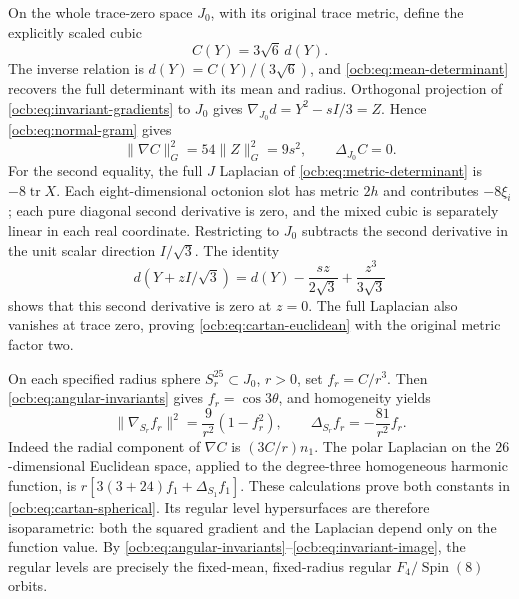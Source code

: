 \documentclass[11pt]{article}
\theoremstyle{definition}
\begin{document}
On the whole trace-zero space $J_0$, with its original trace metric,
define the explicitly scaled cubic
\begin{equation}
 C(Y)=3\sqrt6\,d(Y).
 \label{ocb:eq:cartan-polynomial}\tag{OCB28}
\end{equation}
The inverse relation is $d(Y)=C(Y)/(3\sqrt6)$, and
\eqref{ocb:eq:mean-determinant} recovers the full determinant with
its mean and radius. Orthogonal projection of
\eqref{ocb:eq:invariant-gradients} to $J_0$ gives
$\nabla_{J_0}d=Y^2-sI/3=Z$. Hence
\eqref{ocb:eq:normal-gram} gives
\begin{equation}
 \|\nabla C\|_G^2=54\|Z\|_G^2=9s^2,
 \qquad\Delta_{J_0}C=0.
 \label{ocb:eq:cartan-euclidean}\tag{OCB29}
\end{equation}
For the second equality, the full $J$ Laplacian of
\eqref{ocb:eq:metric-determinant} is $-8\operatorname{tr}X$.
Each eight-dimensional octonion slot has metric $2h$ and contributes
$-8\xi_i$; each pure diagonal second derivative is zero, and the
mixed cubic is separately linear in each real coordinate. Restricting
to $J_0$ subtracts the second derivative in the unit scalar direction
$I/\sqrt3$. The identity
\[
 d(Y+zI/\sqrt3)=d(Y)-\frac{s z}{2\sqrt3}
                              +\frac{z^3}{3\sqrt3}
\]
shows that this second derivative is zero at $z=0$. The full
Laplacian also vanishes at trace zero, proving
\eqref{ocb:eq:cartan-euclidean} with the original metric factor two.

On each specified radius sphere $S_r^{25}\subset J_0$, $r>0$,
set $f_r=C/r^3$. Then \eqref{ocb:eq:angular-invariants} gives
$f_r=\cos3\theta$, and homogeneity yields
\begin{equation}
 \|\nabla_{S_r}f_r\|^2=\frac9{r^2}(1-f_r^2),\qquad
 \Delta_{S_r}f_r=-\frac{81}{r^2}f_r.
 \label{ocb:eq:cartan-spherical}\tag{OCB30}
\end{equation}
Indeed the radial component of $\nabla C$ is $(3C/r)n_1$.
The polar Laplacian on the $26$-dimensional Euclidean space,
applied to the degree-three homogeneous harmonic function, is
$r[3(3+24)f_1+\Delta_{S_1}f_1]$. These calculations prove both
constants in \eqref{ocb:eq:cartan-spherical}. Its regular level
hypersurfaces are therefore isoparametric: both the squared gradient
and the Laplacian depend only on the function value. By
\eqref{ocb:eq:angular-invariants}--\eqref{ocb:eq:invariant-image},
the regular levels are precisely the fixed-mean, fixed-radius regular
$F_4/\operatorname{Spin}(8)$ orbits.
\end{document}
